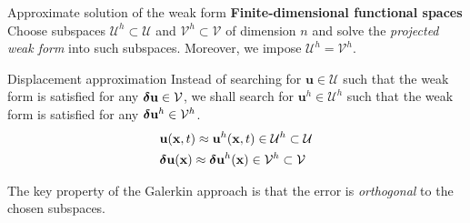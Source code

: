 \documentclass[aspectratio=169]{beamer}
\begin{document}
\begin{frame}{Approximate solution of the weak form}
  \textbf{\large Finite-dimensional functional spaces}
  \newline\noindent Choose subspaces $\mathcal U^{h}\subset \mathcal U$ and $\mathcal V^{h}\subset \mathcal V$ of {\color{darkred}dimension $n$}  and solve the \emph{projected weak form} into such subspaces. Moreover, we impose $\mathcal U^{h}=\mathcal V^{h}$.
  \vspace{0.1cm}
  \begin{block}{\large Displacement approximation}
    Instead of searching for $\mathbf u\in \mathcal U$ such that the weak form is satisfied for any $\boldsymbol\delta \mathbf u\in \mathcal V$, we shall search for $\mathbf u^{h}\in\mathcal U^{h}$ such that the weak form is satisfied for any $\boldsymbol\delta \mathbf u^{h}\in \mathcal V^{h}$.
    \begin{align*}
       & \mathbf u(\mathbf x,t)\approx\mathbf u^{h}(\mathbf x,t)\in\mathcal U^{h}\subset\mathcal U                 \\
       & \boldsymbol\delta\mathbf u(\mathbf x)\approx\boldsymbol\delta\mathbf u^{h}(\mathbf x)\in\mathcal V^{h}\subset\mathcal V
    \end{align*}
  \end{block}
  \vspace{0.1cm}

  The key property of the Galerkin approach is that the error is \emph{orthogonal} to the chosen subspaces.
\end{frame}
\end{document}
